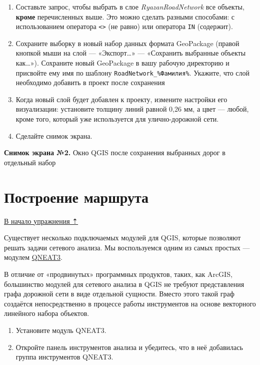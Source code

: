 \documentclass[
  12pt,
]{book}
\begin{document}
\begin{enumerate}
\def\labelenumi{\arabic{enumi}.}
\item
  Составьте запрос, чтобы выбрать в слое \emph{RyazanRoadNetwork} все объекты, \textbf{кроме} перечисленных выше. Это можно сделать разными способами: с использованием оператора \texttt{\textless{}\textgreater{}} (не равно) или оператора \texttt{IN} (содержит).
\item
  Сохраните выборку в новый набор данных формата GeoPackage (правой кнопкой мыши на слой --- «Экспорт\ldots» --- «Сохранить выбранные объекты как\ldots»). Сохраните новый GeoPackage в вашу рабочую директорию и присвойте ему имя по шаблону \texttt{RoadNetwork\_\%Фамилия\%}. Укажите, что слой необходимо добавить в проект после сохранения
\item
  Когда новый слой будет добавлен к проекту, измените настройки его визуализации: установите толщину линий равной 0,26 мм, а цвет --- любой, кроме того, который уже используется для улично-дорожной сети.
\item
  Сделайте снимок экрана.
\end{enumerate}

\textbf{Снимок экрана №2.} Окно QGIS после сохранения выбранных дорог в отдельный набор

\hypertarget{networks-route}{%
\section{Построение маршрута}\label{networks-route}}

\protect\hyperlink{networks}{В начало упражнения ⇡}

Существует несколько подключаемых модулей для QGIS, которые позволяют решать задачи сетевого анализа. Мы воспользуемся одним из самых простых --- модулем \href{https://root676.github.io/}{QNEAT3}.

В отличие от «продвинутых» программных продуктов, таких, как ArcGIS, большинство модулей для сетевого анализа в QGIS не требуют представления графа дорожной сети в виде отдельной сущности. Вместо этого такой граф создаётся непосредственно в процессе работы инструментов на основе векторного линейного набора объектов.

\begin{enumerate}
\def\labelenumi{\arabic{enumi}.}
\item
  Установите модуль QNEAT3.
\item
  Откройте панель инструментов анализа и убедитесь, что в неё добавилась группа инструментов QNEAT3.
\end{enumerate}
\end{document}

